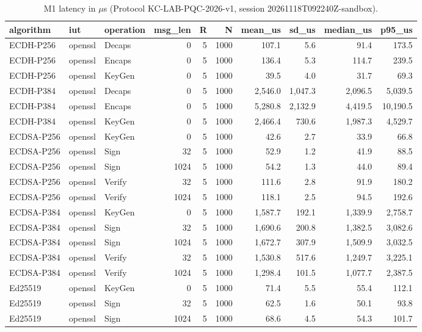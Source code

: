 \begin{table}[ht]
\centering
\caption{M1 latency in $\mu$s (Protocol KC-LAB-PQC-2026-v1, session 20261118T092240Z-sandbox).}
\label{tab:t1}
\small
\begin{tabular}{@{}lllrrrrrrr@{}}
\toprule
algorithm & iut & operation & msg\_len & R & N & mean\_us & sd\_us & median\_us & p95\_us \\
\midrule
ECDH-P256 & openssl & Decaps & 0 & 5 & 1000 & 107.1 & 5.6 & 91.4 & 173.5 \\
ECDH-P256 & openssl & Encaps & 0 & 5 & 1000 & 136.4 & 5.3 & 114.7 & 239.5 \\
ECDH-P256 & openssl & KeyGen & 0 & 5 & 1000 & 39.5 & 4.0 & 31.7 & 69.3 \\
ECDH-P384 & openssl & Decaps & 0 & 5 & 1000 & 2,546.0 & 1,047.3 & 2,096.5 & 5,039.5 \\
ECDH-P384 & openssl & Encaps & 0 & 5 & 1000 & 5,280.8 & 2,132.9 & 4,419.5 & 10,190.5 \\
ECDH-P384 & openssl & KeyGen & 0 & 5 & 1000 & 2,466.4 & 730.6 & 1,987.3 & 4,529.7 \\
ECDSA-P256 & openssl & KeyGen & 0 & 5 & 1000 & 42.6 & 2.7 & 33.9 & 66.8 \\
ECDSA-P256 & openssl & Sign & 32 & 5 & 1000 & 52.9 & 1.2 & 41.9 & 88.5 \\
ECDSA-P256 & openssl & Sign & 1024 & 5 & 1000 & 54.2 & 1.3 & 44.0 & 89.4 \\
ECDSA-P256 & openssl & Verify & 32 & 5 & 1000 & 111.6 & 2.8 & 91.9 & 180.2 \\
ECDSA-P256 & openssl & Verify & 1024 & 5 & 1000 & 118.1 & 2.5 & 94.5 & 192.6 \\
ECDSA-P384 & openssl & KeyGen & 0 & 5 & 1000 & 1,587.7 & 192.1 & 1,339.9 & 2,758.7 \\
ECDSA-P384 & openssl & Sign & 32 & 5 & 1000 & 1,690.6 & 200.8 & 1,382.5 & 3,082.6 \\
ECDSA-P384 & openssl & Sign & 1024 & 5 & 1000 & 1,672.7 & 307.9 & 1,509.9 & 3,032.5 \\
ECDSA-P384 & openssl & Verify & 32 & 5 & 1000 & 1,530.8 & 517.6 & 1,249.7 & 3,225.1 \\
ECDSA-P384 & openssl & Verify & 1024 & 5 & 1000 & 1,298.4 & 101.5 & 1,077.7 & 2,387.5 \\
Ed25519 & openssl & KeyGen & 0 & 5 & 1000 & 71.4 & 5.5 & 55.4 & 112.1 \\
Ed25519 & openssl & Sign & 32 & 5 & 1000 & 62.5 & 1.6 & 50.1 & 93.8 \\
Ed25519 & openssl & Sign & 1024 & 5 & 1000 & 68.6 & 4.5 & 54.3 & 101.7 \\

\end{tabular}
\end{table}
